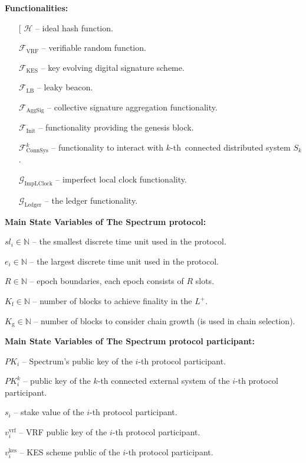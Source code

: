 \textbf{Functionalities:}
\begin{itemize}
    \item[\fontencoding[\ding{113}] $\mathcal{H}$ -- ideal hash function.
    \item[\ding{113}] $\mathcal{F}_{\text{VRF}}$ -- verifiable random function.
    \item[\ding{113}] $\mathcal{F}_{\text{KES}}$ -- key evolving digital signature scheme.
    \item[\ding{113}] $\mathcal{F}_{\text{LB}}$ -- leaky beacon.
    \item[\ding{113}] $\mathcal{F}_{\text{AggSig}}$ -- collective signature aggregation functionality.
    \item[\ding{113}] $\mathcal{F}_{\text{Init}}$ -- functionality providing the genesis block.
    \item[\ding{113}] $\mathcal{F}^k_{\text{ConnSys}}$ -- functionality to interact with $k$-th\
    connected distributed system $S_k$.
    \item[\ding{113}] $\mathcal{G}_{\text{ImpLClock}}$ -- imperfect local clock functionality.
    \item[\ding{113}] $\mathcal{G}_{\text{Ledger}}$ -- the ledger functionality.
\end{itemize}
\bigbreak

\noindent
\textbf{Main State Variables of The Spectrum protocol:}
\begin{legal}
    \item[\ding{113}] $sl_i \in \mathbb{N}$ -- the smallest discrete time unit used in the protocol.
    \item[\ding{113}] $e_i \in \mathbb{N}$ -- the largest discrete time unit used in the protocol.
    \item[\ding{113}] $R \in \mathbb{N}$ -- epoch boundaries, each epoch consists of $R$ slots.
    \item[\ding{113}] $K_{\text{f}} \in \mathbb{N}$ -- number of blocks to achieve finality in the $L^+$.
    \item[\ding{113}] $K_{\text{g}} \in \mathbb{N}$ -- number of blocks to consider chain growth (is used in chain selection).

\end{legal}
\bigbreak

\noindent
\textbf{Main State Variables of The Spectrum protocol participant:}
\begin{legal}
    \item[\ding{113}] $PK_i$ -- Spectrum's public key of the $i$-th protocol participant.
    \item[\ding{113}] $PK^k_i$ -- public key of the $k$-th connected external system of the $i$-th protocol participant.
    \item[\ding{113}] $s_i$ -- stake value of the $i$-th protocol participant.
    \item[\ding{113}] $v^{\text{vrf}}_i$ -- VRF public key of the $i$-th protocol participant.
    \item[\ding{113}] $v^{\text{kes}}_i$ -- KES scheme public of the $i$-th protocol participant.
\end{legal}
\bigbreak

